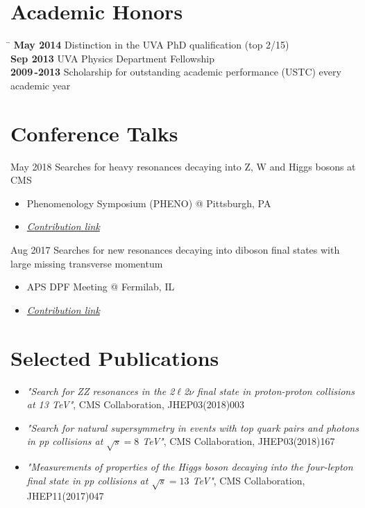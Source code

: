 \documentclass[10pt]{article} %
\begin{document}
\section{Academic Honors}
\begin{tabbing} %
\hspace{2cm} \= \kill
\textbf{May 2014} \> Distinction in the UVA PhD qualification (top 2/15) \\
\textbf{Sep 2013} \> UVA Physics Department Fellowship \\
\textbf{2009\,-2013} \> Scholarship for outstanding academic performance (USTC) every academic year \\
\end{tabbing}

\section{Conference Talks}
\job
{May 2018}{}
{Searches for heavy resonances decaying into Z, W and Higgs bosons at CMS}
{\begin{itemize}
\item Phenomenology Symposium (PHENO) @ Pittsburgh, PA
\item \href{https://indico.cern.ch/event/699148/contributions/2986197/}{\textit{Contribution link}}
\end{itemize}
}
\job
{Aug 2017}{}
{Searches for new resonances decaying into diboson final states with large missing transverse momentum}
{\begin{itemize}
\item APS DPF Meeting @ Fermilab, IL
\item \href{https://indico.fnal.gov/event/11999/session/10/contribution/56}{\textit{Contribution link}}
\end{itemize}
}

\section{Selected Publications}
\begin{itemize}
\item \textit{"Search for ZZ resonances in the 2$\ell$2$\nu$ final state in proton-proton collisions at 13 TeV"}, CMS Collaboration, JHEP03(2018)003

\item \textit{"Search for natural supersymmetry in events with top quark pairs and photons in pp collisions at $\sqrt{s}=8$ TeV"}, CMS Collaboration, JHEP03(2018)167

\item \textit{"Measurements of properties of the Higgs boson decaying into the four-lepton final state in pp collisions at $\sqrt{s}=13$ TeV"}, CMS Collaboration, JHEP11(2017)047
\end{itemize}
\end{document}
